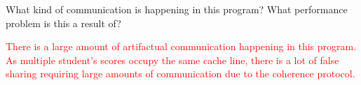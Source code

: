 \documentclass[11pt]{article}
\newenvironment{choice}{\begin{enumerate}[A.]}{\end{enumerate}}
\newenvironment{answer}{\begin{minipage}[c][1.5in]{\textwidth}}{\end{minipage}}
\begin{document}
\begin{choice}
  What kind of communication is happening in this program? What performance problem is this a result of?

\begin{answer}
  \textcolor{red}{
    There is a large amount of artifactual communication happening in this program. As multiple 
    student’s scores occupy the same cache line, there is a lot of false sharing requiring large 
    amounts of communication due to the coherence protocol.
  }
\end{answer}

\end{choice}  
\end{document}
